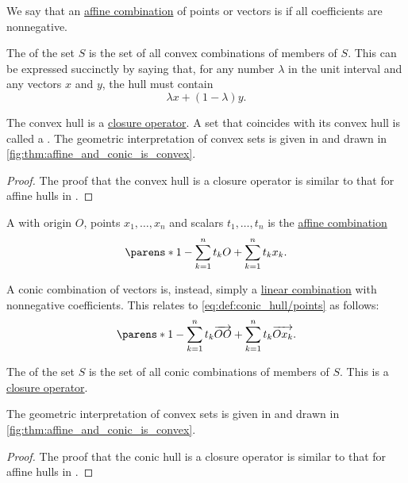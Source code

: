 \begin{definition}\label{def:convex_hull}\mimprovised
  We say that an \hyperref[rem:affine_combinations]{affine combination} of points or vectors is  if all coefficients are nonnegative.

  The  of the set \( S \) is the set of all convex combinations of members of \( S \). This can be expressed succinctly by saying that, for any number \( \lambda \) in the unit interval and any vectors \( x \) and \( y \), the hull must contain
  \begin{equation}\label{eq:def:convex_hull/combination}
    \lambda x + (1 - \lambda) y.
  \end{equation}

  The convex hull is a \hyperref[def:closure_operator]{closure operator}. A set that coincides with its convex hull is called a . The geometric interpretation of convex sets is given in  and drawn in \cref{fig:thm:affine_and_conic_is_convex}.
\end{definition}
\begin{proof}
  The proof that the convex hull is a closure operator is similar to that for affine hulls in .
\end{proof}

\begin{definition}\label{def:conic_hull}\mimprovised
  A  with origin \( O \), points \( x_1, \ldots, x_n \) and  scalars \( t_1, \ldots, t_n \) is the \hyperref[rem:affine_combination]{affine combination}
  \begin{equation}\label{eq:def:conic_hull/points}
    \parens*{ 1 - \sum_{k=1}^n t_k } O + \sum_{k=1}^n t_k x_k.
  \end{equation}

  A conic combination of vectors is, instead, simply a \hyperref[rem:linear_combinations]{linear combination} with nonnegative coefficients. This relates to \eqref{eq:def:conic_hull/points} as follows:
  \begin{equation*}
    \parens*{ 1 - \sum_{k=1}^n t_k } \vect{OO} + \sum_{k=1}^n t_k \vect{O x_k}.
  \end{equation*}

  The  of the set \( S \) is the set of all conic combinations of members of \( S \). This is a \hyperref[def:closure_operator]{closure operator}.

  The geometric interpretation of convex sets is given in  and drawn in \cref{fig:thm:affine_and_conic_is_convex}.
\end{definition}
\begin{proof}
  The proof that the conic hull is a closure operator is similar to that for affine hulls in .
\end{proof}

